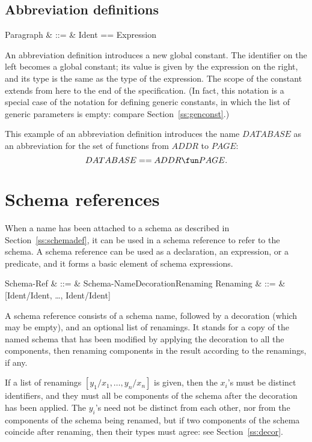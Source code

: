 \subsection{Abbreviation definitions}\label{ss:abbrev}

\begin{syntax}
       Paragraph & ::= & Ident == Expression
\end{syntax}
An abbreviation definition\symdex{$==$} introduces a new global constant. The identifier
on the left becomes a global constant; its value is given by the
expression on the right, and its type is the same as the type of the
expression. The scope of the constant extends from here to the end of
the specification. (In fact, this notation is a special case of the
notation for defining generic constants, in which the list of
generic parameters is empty: compare Section~\ref{ss:genconst}.)

This example of an abbreviation definition introduces the name
$DATABASE$ as an abbreviation for the set of functions from $ADDR$ to
$PAGE$:
\[ DATABASE == ADDR \fun PAGE. \]

\section{Schema references}\label{s:schemaref}

\new When a name has been attached to a schema as described in
Section~\ref{ss:schemadef}, it can be used in a schema
reference to refer to the schema. A schema
reference can be used as a declaration, an expression, or a predicate,
and it forms a basic element of schema expressions.
\begin{syntax}
Schema-Ref
	& ::= & Schema-Name\;Decoration\;\lopt Renaming \ropt
\also
Renaming & ::= & [Ident/Ident, \ldots, Ident/Ident]
\end{syntax}
A schema reference consists of a schema name, followed by a
decoration (which may be empty), and an optional
list of renamings. It stands for a copy of the named schema that has
been modified by applying the decoration to all the components, then
renaming components in the result according to the renamings, if any.

\new If a list of renamings $[y_1/x_1, \ldots, y_n/x_n]$ is given,
then the $x_i$'s must be distinct identifiers, and they must all be
components of the schema after the decoration has been applied.  The
$y_i$'s need not be distinct from each other, nor from the
components of the schema being renamed, but if two components of the
schema coincide after renaming, then their types must agree: see
Section~\ref{ss:decor}.

